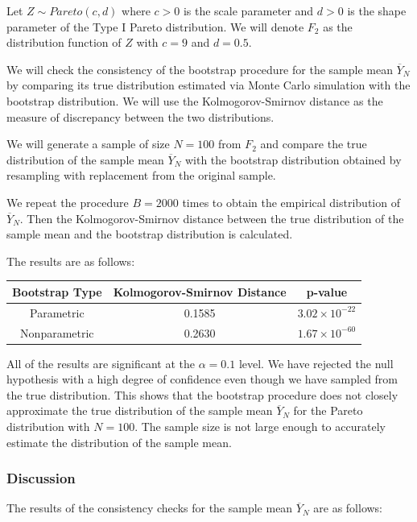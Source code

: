 \documentclass{article}
\begin{document}
Let \(Z \sim Pareto(c, d)\) where \(c > 0\) is the scale parameter and \(d > 0\) is the shape parameter of the Type I Pareto distribution. We will denote \(F_2\) as the distribution function of \(Z\) with \(c = 9\) and \(d = 0.5\).

We will check the consistency of the bootstrap procedure for the sample mean \(\overline{Y}_N\) by comparing its true distribution estimated via Monte Carlo simulation with the bootstrap distribution. We will use the Kolmogorov-Smirnov distance as the measure of discrepancy between the two distributions.

We will generate a sample of size \(N = 100\) from \(F_2\) and compare the true distribution of the sample mean \(\overline{Y}_N\) with the bootstrap distribution obtained by resampling with replacement from the original sample.

We repeat the procedure \(B = 2000\) times to obtain the empirical distribution of \(\overline{Y}_N\). Then the Kolmogorov-Smirnov distance between the true distribution of the sample mean and the bootstrap distribution is calculated.

The results are as follows:

\begin{table}[h]
\centering
\begin{tabular}{|c|c|c|}
\hline
\textbf{Bootstrap Type} & \textbf{Kolmogorov-Smirnov Distance} & \textbf{p-value} \\ \hline
Parametric & 0.1585 & \(3.02 \times 10^{-22}\) \\ \hline
Nonparametric & 0.2630 & \(1.67 \times 10^{-60}\) \\ \hline
\end{tabular}
\end{table}

All of the results are significant at the \(\alpha = 0.1\) level. We have rejected the null hypothesis with a high degree of confidence even though we have sampled from the true distribution. This shows that the bootstrap procedure does not closely approximate the true distribution of the sample mean \(\overline{Y}_N\) for the Pareto distribution with \(N = 100\). The sample size is not large enough to accurately estimate the distribution of the sample mean.

\subsubsection{Discussion}

The results of the consistency checks for the sample mean \(\overline{Y}_N\) are as follows:
\end{document}

